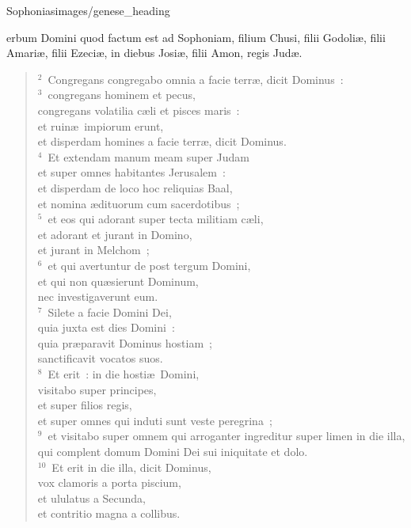 {Sophonias}{images/genese_heading}


\bchapter
{}erbum Domini quod factum est ad Sophoniam, filium Chusi, filii Godoli\ae , filii Amari\ae , filii Ezeci\ae , in diebus Josi\ae , filii Amon, regis Jud\ae .


\begin{verse}${}^{2}$~Congregans congregabo omnia a facie terr\ae , dicit Dominus~:\\
${}^{3}$~congregans hominem et pecus,\\ congregans volatilia c\ae li et pisces maris~:\\ et ruin\ae\ impiorum erunt,\\ et disperdam homines a facie terr\ae , dicit Dominus.\\
${}^{4}$~Et extendam manum meam super Judam\\ et super omnes habitantes Jerusalem~:\\ et disperdam de loco hoc reliquias Baal,\\ et nomina \ae dituorum cum sacerdotibus~;\\
${}^{5}$~et eos qui adorant super tecta militiam c\ae li,\\ et adorant et jurant in Domino,\\ et jurant in Melchom~;\\
${}^{6}$~et qui avertuntur de post tergum Domini,\\ et qui non qu\ae sierunt Dominum,\\ nec investigaverunt eum.\\
${}^{7}$~Silete a facie Domini Dei,\\ quia juxta est dies Domini~:\\ quia pr\ae paravit Dominus hostiam~;\\ sanctificavit vocatos suos.\\
${}^{8}$~Et erit~: in die hosti\ae\ Domini,\\ visitabo super principes,\\ et super filios regis,\\ et super omnes qui induti sunt veste peregrina~;\\
${}^{9}$~et visitabo super omnem qui arroganter ingreditur super limen in die illa,\\ qui complent domum Domini Dei sui iniquitate et dolo.\\
${}^{10}$~Et erit in die illa, dicit Dominus,\\ vox clamoris a porta piscium,\\ et ululatus a Secunda,\\ et contritio magna a collibus.\\

\end{verse}

